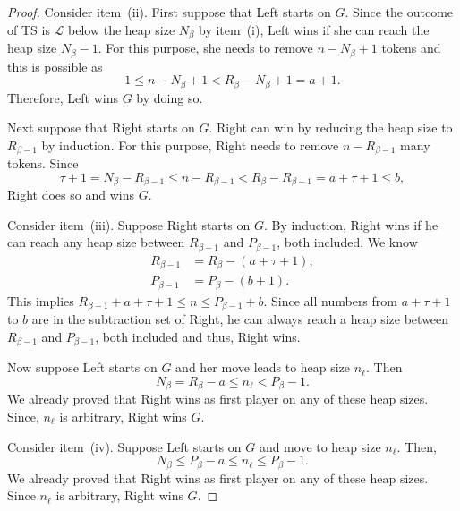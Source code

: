 \documentclass[oneside,reqno]{amsart}
\newcommand{\ts}{\mathcal{T}}
\newcommand{\lp}{\mathscr{L}}
\newcommand{\rp}{\mathscr{R}}
\begin{document}
\begin{proof}
    Consider item~(ii). First suppose that Left starts on $G$. Since the outcome of {\sc TS} is $\lp$ below the heap size $N_\beta$ by item~(i), Left wins if she can reach the heap size $N_\beta-1$. For this purpose, she needs to remove $n-N_\beta+1$ tokens %
    and this is possible as $$1\le n-N_\beta+1< R_\beta-N_\beta+1=a+1.$$ Therefore, Left wins $G$ by doing so. 
    
    Next suppose that Right starts on $G$. 
    Right can win by reducing the heap size to $R_{\beta-1}$ by induction. For this purpose, Right needs to remove $n-R_{\beta-1}$ many tokens. Since $$\tau+1=N_\beta-R_{\beta-1}\le n-R_{\beta-1}<R_\beta-R_{\beta-1}=a+\tau+1\le b,$$ Right does so and wins $G$. %

    Consider item~(iii). Suppose Right starts on $G$. %
    By induction, Right wins if he can reach any heap size between $R_{\beta-1}$ and $P_{\beta-1}$, both included. We know \begin{align*}
        R_{\beta-1}&=R_\beta-(a+\tau+1),\\
        P_{\beta-1}&=P_\beta-(b+1).
    \end{align*}This implies $R_{\beta-1}+a+\tau+1\le n\le P_{\beta-1}+b$. Since all numbers from $a+\tau+1$ to $b$ are in the subtraction set of Right, he can always reach a heap size between $R_{\beta-1}$ and $P_{\beta-1}$, both included and thus, Right wins. 
    
    Now suppose Left starts on $G$ and her move leads to heap size $n_\ell$. Then $$N_\beta=R_\beta-a\le n_\ell< P_\beta-1.$$ We already proved that Right wins as first player on any of these heap sizes. Since, $n_\ell$ is arbitrary, Right wins $G$. 

    Consider item~(iv). Suppose Left starts on $G$ and move to heap size $n_\ell$. Then, $$N_\beta\le P_\beta-a\le n_\ell\le P_\beta-1.$$ We already proved that Right wins as first player on any of these heap sizes. Since $n_\ell$ is arbitrary, Right wins $G$. 
    

\end{proof}
\end{document}
